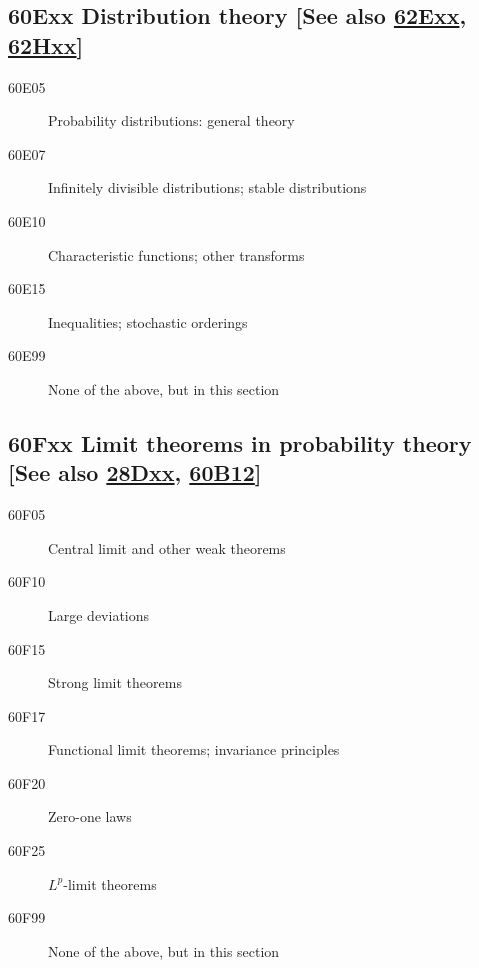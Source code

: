 \documentclass[letterpaper]{article}
\begin{document}
\subsection*{60Exx  Distribution theory [See also \hyperref[62Exx]{62Exx}, \hyperref[62Hxx]{62Hxx}] }\label{60Exx}
\begin{description}  
\item [60E05]\label{60E05} Probability distributions: general theory
\item [60E07]\label{60E07} Infinitely divisible distributions; stable distributions
\item [60E10]\label{60E10} Characteristic functions; other transforms
\item [60E15]\label{60E15} Inequalities; stochastic orderings
\item [60E99]\label{60E99} None of the above, but in this section
\end{description}
\subsection*{60Fxx  Limit theorems in probability theory [See also \hyperref[28Dxx]{28Dxx}, \hyperref[60B12]{60B12}] }\label{60Fxx}
\begin{description}  
\item [60F05]\label{60F05} Central limit and other weak theorems
\item [60F10]\label{60F10} Large deviations
\item [60F15]\label{60F15} Strong limit theorems
\item [60F17]\label{60F17} Functional limit theorems; invariance principles
\item [60F20]\label{60F20} Zero-one laws
\item [60F25]\label{60F25} $L^p$-limit theorems
\item [60F99]\label{60F99} None of the above, but in this section
\end{description}
\end{document}
